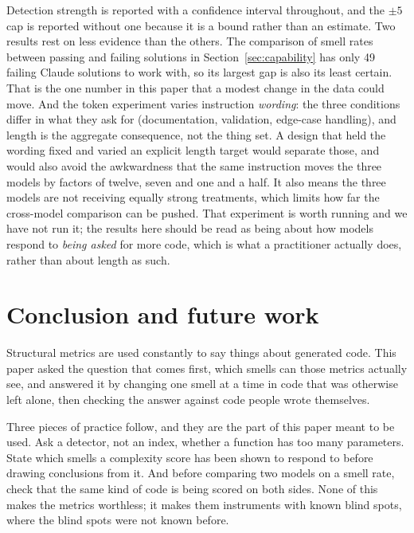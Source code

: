 \documentclass[10pt,a4paper,twocolumn]{article}
\begin{document}
Detection strength is reported with a confidence interval throughout, and the
$\pm 5$ cap is reported without one because it is a bound rather than an
estimate. Two results rest on less evidence than the others. The comparison of smell rates
between passing and failing solutions in Section~\ref{sec:capability} has only
49 failing Claude solutions to work with, so its largest gap is also its least
certain. That is the one number in this paper that a modest change in the data
could move. And the token experiment varies instruction \emph{wording}: the
three conditions differ in what they ask for (documentation, validation,
edge-case handling), and length is the aggregate consequence, not the thing set.
A design that held the wording fixed and varied an explicit length target would
separate those, and would also avoid the awkwardness that the same instruction
moves the three models by factors of twelve, seven and one and a half. It also means the three models are not receiving equally strong treatments,
which limits how far the cross-model comparison can be pushed. That experiment
is worth running and we have not run it; the results here should be read as
being about how models respond to \emph{being asked} for more code, which is
what a practitioner actually does, rather than about length as such.

\section{Conclusion and future work}
\label{sec:conclusion}

Structural metrics are used constantly to say things about generated code. This
paper asked the question that comes first, which smells can those metrics
actually see, and answered it by changing one smell at a time in code that was
otherwise left alone, then checking the answer against code people wrote
themselves.

Three pieces of practice follow, and they are the part of this paper meant to be
used. Ask a detector, not an index, whether a function has too many parameters.
State which smells a complexity score has been shown to respond to before drawing
conclusions from it. And before comparing two models on a smell rate, check that
the same kind of code is being scored on both sides. None of this makes the
metrics worthless; it makes them instruments with known blind spots, where the
blind spots were not known before.
\end{document}
